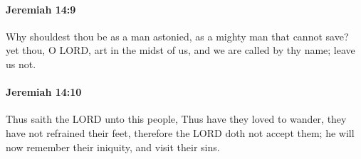 		\paragraph{Jeremiah 14:9} %
			\label{JEREMIAH-14-9}

			Why shouldest thou be as a man astonied, as a mighty man that cannot save? yet thou, O LORD, art in the midst of us, and we are called by thy name; leave us not.


		\paragraph{Jeremiah 14:10} %
			\label{JEREMIAH-14-10}

			Thus saith the LORD unto this people, Thus have they loved to wander, they have not refrained their feet, therefore the LORD doth not accept them; he will now remember their iniquity, and visit their sins.

